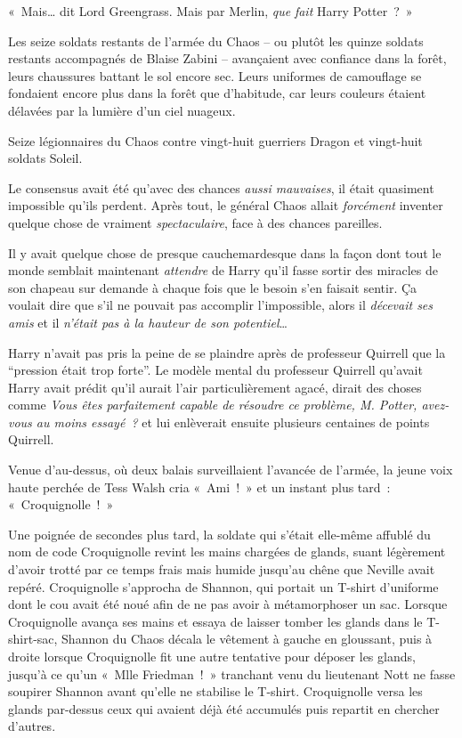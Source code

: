«~Mais… dit Lord Greengrass.
Mais par Merlin, \emph{que} \emph{fait} Harry Potter~?~»

\later

Les seize soldats restants de l'armée du Chaos -- ou plutôt les quinze soldats restants accompagnés de Blaise Zabini -- avançaient avec confiance dans la forêt, leurs chaussures battant le sol encore sec.
Leurs uniformes de camouflage se fondaient encore plus dans la forêt que d'habitude, car leurs couleurs étaient délavées par la lumière d'un ciel nuageux.

Seize légionnaires du Chaos contre vingt-huit guerriers Dragon et vingt-huit soldats Soleil.

Le consensus avait été qu'avec des chances \emph{aussi mauvaises}, il était quasiment impossible qu'ils perdent.
Après tout, le général Chaos allait \emph{forcément} inventer quelque chose de vraiment \emph{spectaculaire}, face à des chances pareilles.

Il y avait quelque chose de presque cauchemardesque dans la façon dont tout le monde semblait maintenant \emph{attendre} de Harry qu'il fasse sortir des miracles de son chapeau sur demande à chaque fois que le besoin s'en faisait sentir.
Ça voulait dire que s'il ne pouvait pas accomplir l'impossible, alors il \emph{décevait ses amis} et il \emph{n'était pas à la hauteur de son potentiel}…

Harry n'avait pas pris la peine de se plaindre après de professeur Quirrell que la “pression était trop forte”.
Le modèle mental du professeur Quirrell qu'avait Harry avait prédit qu'il aurait l'air particulièrement agacé, dirait des choses comme \emph{Vous êtes parfaitement capable de résoudre ce problème, M. Potter, avez-vous au moins essayé~?} et lui enlèverait ensuite plusieurs centaines de points Quirrell.

Venue d'au-dessus, où deux balais surveillaient l'avancée de l'armée, la jeune voix haute perchée de Tess Walsh cria «~Ami~!~»
et un instant plus tard~: «~Croquignolle~!~»

Une poignée de secondes plus tard, la soldate qui s'était elle-même affublé du nom de code Croquignolle revint les mains chargées de glands, suant légèrement d'avoir trotté par ce temps frais mais humide jusqu'au chêne que Neville avait repéré.
Croquignolle s'approcha de Shannon, qui portait un T-shirt d'uniforme dont le cou avait été noué afin de ne pas avoir à métamorphoser un sac.
Lorsque Croquignolle avança ses mains et essaya de laisser tomber les glands dans le T-shirt-sac, Shannon du Chaos décala le vêtement à gauche en gloussant, puis à droite lorsque Croquignolle fit une autre tentative pour déposer les glands, jusqu'à ce qu'un «~Mlle Friedman~!~»
tranchant venu du lieutenant Nott ne fasse soupirer Shannon avant qu'elle ne stabilise le T-shirt.
Croquignolle versa les glands par-dessus ceux qui avaient déjà été accumulés puis repartit en chercher d'autres.

